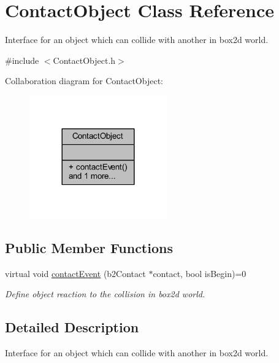 \hypertarget{class_contact_object}{}\section{Contact\+Object Class Reference}
\label{class_contact_object}


Interface for an object which can collide with another in box2d world.  




{\ttfamily \#include $<$Contact\+Object.\+h$>$}



Collaboration diagram for Contact\+Object\+:
\nopagebreak
\begin{figure}[H]
\begin{center}
\leavevmode
\includegraphics[width=168pt]{class_contact_object__coll__graph}
\end{center}
\end{figure}
\subsection*{Public Member Functions}
\begin{DoxyCompactItemize}
\item 
virtual void \hyperlink{class_contact_object_a53d2dfc1d9c2821e9c62e80ce62a6435}{contact\+Event} (b2\+Contact $\ast$contact, bool is\+Begin)=0
\begin{DoxyCompactList}\small\item\em Define object reaction to the collision in box2d world. \end{DoxyCompactList}\end{DoxyCompactItemize}


\subsection{Detailed Description}
Interface for an object which can collide with another in box2d world. 

